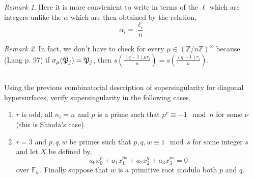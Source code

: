 \documentclass[12pt]{article}
\newcommand{\Z}{\mathbb{Z}}
\newcommand{\FF}{\mathbb{F}}
\theoremstyle{remark}
\newtheorem*{rmk}{Remark}
\theoremstyle{definition}
\begin{document}
\begin{rmk}
Here it is more convienient to write in terms of the $\ell$ which are integers unlike the $\alpha$ which are then obtained by the relation,
\[ \alpha_i = \frac{\ell_i}{n} \] 
\end{rmk}

\begin{rmk}
In fact, we don't have to check for every $\mu \in (\Z / n \Z)^\times$ because (Lang p. 97) if $\sigma_\mu(\mathfrak{P}_j) = \mathfrak{P}_j$, then $s\left(\frac{(q-1)\mu r_i}{n}\right) = s\left(\frac{(q-1) r_i}{n}\right)$.
\end{rmk}


\subsection{}

Using the previous combinatorial description of supersingularity for diagonal hypersurfaces, verify supersingularity in the following cases,
\begin{enumerate}
\item $r$ is odd, all $n_i = n$ and $p$ is a prime such that $p^\nu \equiv -1 \mod n$ for some $\nu$ (this is Shioda's case).

\item $r = 3$ and $p,q,w$ be primes such that $p,q,w \equiv 1 \mod s$ for some integer $s$ and let $X$ be defined by,
\[ a_0 x_0^p + a_1 x_1^{ps} + a_2 x_2^q + a_3 x_3^{ps} = 0 \]
over $\FF_w$. Finally suppose that $w$ is a primitive root modulo both $p$ and $q$.
\end{enumerate}

\printbibliography
\end{document}
